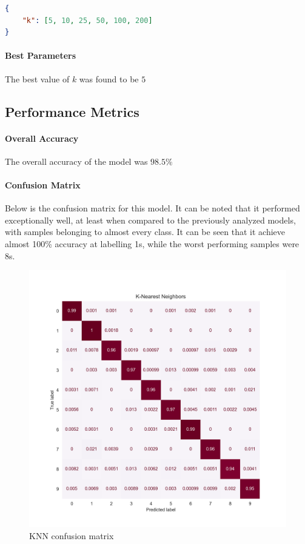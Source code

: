 \begin{lstlisting}[language=json]
{
    "k": [5, 10, 25, 50, 100, 200]
}
\end{lstlisting}

\paragraph{Best Parameters} The best value of $k$ was found to be $5$

\subsection{Performance Metrics}

\paragraph{Overall Accuracy} The overall accuracy of the model was $98.5\%$

\paragraph{Confusion Matrix} Below is the confusion matrix for this model. It can be noted that it performed exceptionally well, at least when compared to the previously analyzed models, with samples belonging to almost every class. It can be seen that it achieve almost 100\% accuracy at labelling 1s, while the worst performing samples were 8s.

\begin{figure}[h]
    \centering
    \includegraphics[scale=0.65]{images/exp-results/knn/knn_conf-matrix.png}
    \caption{KNN confusion matrix}
    \label{fig:exp_res_knn_conf_mat}
\end{figure}


